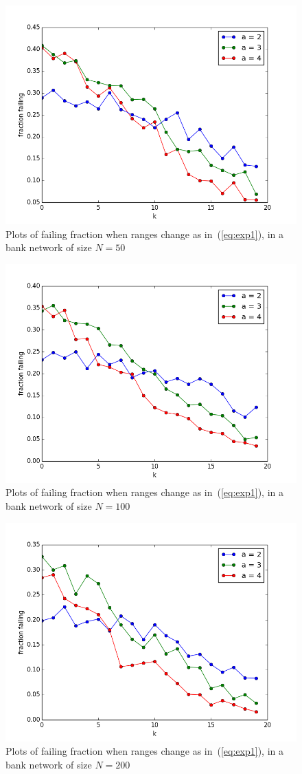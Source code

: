 \documentclass[a4paper, 11pt]{article}
\begin{document}
\begin{figure}[htbp]
    \centering
	\includegraphics[width=.8\textwidth]{images/ff50.png}
	\caption{Plots of failing fraction when ranges change as in~(\ref{eq:exp1}), in a bank network of size $N=50$}\label{fig:exp4}
\end{figure}
\begin{figure}[htbp]
    \centering
	\includegraphics[width=.8\textwidth]{images/ff100.png}
	\caption{Plots of failing fraction when ranges change as in~(\ref{eq:exp1}), in a bank network of size $N=100$}\label{fig:exp5}
\end{figure}
\begin{figure}[htbp]
    \centering
	\includegraphics[width=.8\textwidth]{images/ff200.png}
	\caption{Plots of failing fraction when ranges change as in~(\ref{eq:exp1}), in a bank network of size $N=200$}\label{fig:exp6}
\end{figure}
\end{document}
